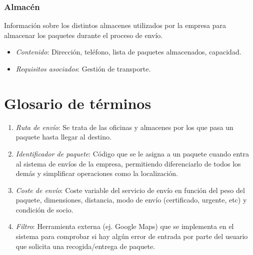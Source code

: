 \subsubsection{Almacén}
Información sobre los distintos almacenes utilizados por la empresa para almacenar los paquetes durante el proceso de envío.
\begin{itemize}
	\item \textit{Contenido}: Dirección, teléfono, lista de paquetes almacenados, capacidad.
	
	\item \textit{Requisitos asociados}: Gestión de transporte. \\
\end{itemize}

\newpage

\section{Glosario de términos}
	\begin{enumerate}
		\item \textit{Ruta de envío}: Se trata de las oficinas y almacenes por los que pasa un paquete hasta llegar al destino.
		\item \textit{Identificador de paquete}: Código que se le asigna a un paquete cuando entra al sistema de envíos de la empresa, permitiendo diferenciarlo de todos los demás y simplificar operaciones como la localización.
		\item \textit{Coste de envío}: Coste variable del servicio de envío en función del peso del paquete, dimensiones, distancia, modo de envío (certificado, urgente, etc) y condición de socio.
		\item \textit{Filtro}: Herramienta externa (ej. Google Maps) que se implementa  en el sistema para comprobar si hay algún error de entrada por parte del usuario que solicita una recogida/entrega de paquete.
 	\end{enumerate}
\newpage


